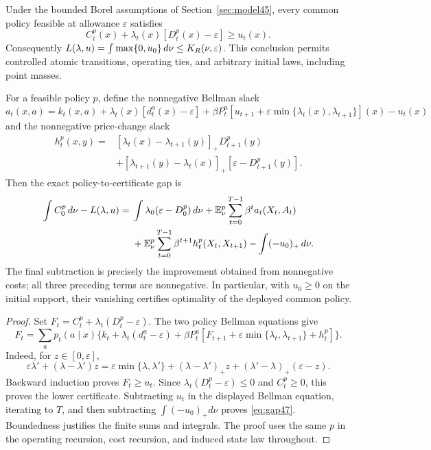 \begin{theorem}\label{thm:restart47}
Under the bounded Borel assumptions of Section~\ref{sec:model45}, every common policy feasible at allowance $\varepsilon$ satisfies
\begin{equation}\label{eq:priceplane47}
 C_t^p(x)+\lambda_t(x)[D_t^p(x)-\varepsilon]\ge u_t(x).
\end{equation}
Consequently $L(\lambda,u)=\int\max\{0,u_0\}\,d\nu\le K_R(\nu,\varepsilon)$.
This conclusion permits controlled atomic transitions, operating ties, and arbitrary initial laws, including point masses.

For a feasible policy $p$, define the nonnegative Bellman slack
\[
 a_t(x,a)=k_t(x,a)+\lambda_t(x)[d_t^a(x)-\varepsilon]
 +\beta P_t^a[u_{t+1}+\varepsilon\min\{\lambda_t(x),\lambda_{t+1}\}](x)-u_t(x)
\]
and the nonnegative price-change slack
\begin{align*}
 h_t^p(x,y)={}&[\lambda_t(x)-\lambda_{t+1}(y)]_+D_{t+1}^p(y)\\
 &+[\lambda_{t+1}(y)-\lambda_t(x)]_+[\varepsilon-D_{t+1}^p(y)].
\end{align*}
Then the exact policy-to-certificate gap is
\begin{align}
 \int C_0^p\,d\nu-L(\lambda,u)
 ={}&\int\lambda_0(\varepsilon-D_0^p)\,d\nu
 +\mathbb E_\nu^p\sum_{t=0}^{T-1}\beta^t a_t(X_t,A_t)\label{eq:gap47}\\
 &+\mathbb E_\nu^p\sum_{t=0}^{T-1}\beta^{t+1}h_t^p(X_t,X_{t+1})
 -\int(-u_0)_+\,d\nu.\nonumber
\end{align}
The final subtraction is precisely the improvement obtained from nonnegative costs; all three preceding terms are nonnegative. In particular, with $u_0\ge0$ on the initial support, their vanishing certifies optimality of the deployed common policy.
\end{theorem}
\begin{proof}
Set $F_t=C_t^p+\lambda_t(D_t^p-\varepsilon)$. The two policy Bellman equations give
\[
 F_t=\sum_a p_t(a\mid x)\{k_t+\lambda_t(d_t^a-\varepsilon)
 +\beta P_t^a[F_{t+1}+\varepsilon\min\{\lambda_t,\lambda_{t+1}\}+h_t^p]\}.
\]
Indeed, for $z\in[0,\varepsilon]$,
\[
 \varepsilon\lambda'+(\lambda-\lambda')z
 =\varepsilon\min\{\lambda,\lambda'\}
 +(\lambda-\lambda')_+z+(\lambda'-\lambda)_+(\varepsilon-z).
\]
Backward induction proves $F_t\ge u_t$. Since $\lambda_t(D_t^p-\varepsilon)\le0$ and $C_t^p\ge0$, this proves the lower certificate. Subtracting $u_t$ in the displayed Bellman equation, iterating to $T$, and then subtracting $\int(-u_0)_+d\nu$ proves \eqref{eq:gap47}. Boundedness justifies the finite sums and integrals. The proof uses the same $p$ in the operating recursion, cost recursion, and induced state law throughout.
\end{proof}

